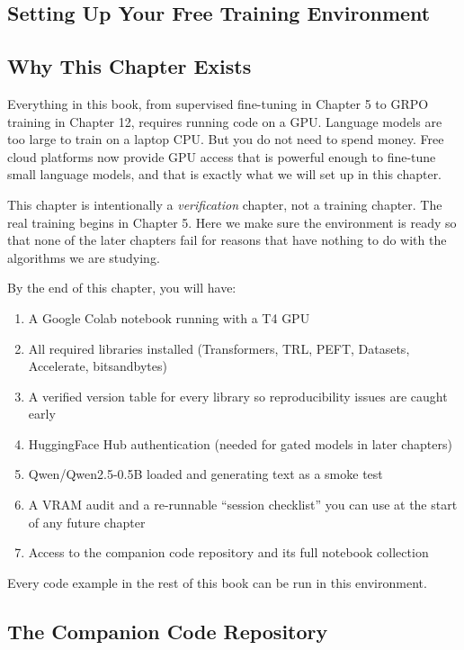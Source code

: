 \begin{chapterenv}

\chapter{Setting Up Your Free Training Environment}

\section{Why This Chapter Exists}

Everything in this book, from supervised fine-tuning in Chapter 5 to GRPO training in Chapter 12, requires running code on a GPU. Language models are too large to train on a laptop CPU. But you do not need to spend money. Free cloud platforms now provide GPU access that is powerful enough to fine-tune small language models, and that is exactly what we will set up in this chapter.

This chapter is intentionally a \emph{verification} chapter, not a training chapter. The real training begins in Chapter 5. Here we make sure the environment is ready so that none of the later chapters fail for reasons that have nothing to do with the algorithms we are studying.

By the end of this chapter, you will have:

\begin{enumerate}[nosep]
    \item A Google Colab notebook running with a T4 GPU
    \item All required libraries installed (Transformers, TRL, PEFT, Datasets, Accelerate, bitsandbytes)
    \item A verified version table for every library so reproducibility issues are caught early
    \item HuggingFace Hub authentication (needed for gated models in later chapters)
    \item Qwen/Qwen2.5-0.5B loaded and generating text as a smoke test
    \item A VRAM audit and a re-runnable ``session checklist'' you can use at the start of any future chapter
    \item Access to the companion code repository and its full notebook collection
\end{enumerate}

Every code example in the rest of this book can be run in this environment.

\section{The Companion Code Repository}


\end{chapterenv}
